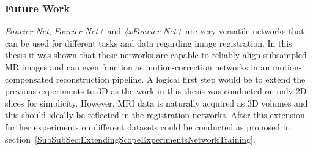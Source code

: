 \subsubsection{Future Work} \label{SubSubSec:FutureWork}
\emph{Fourier-Net}, \emph{Fourier-Net+} and \emph{4xFourier-Net+} are very versatile networks that can be used for different tasks and data regarding image registration. In this thesis it was shown that these networks are capable to reliably align subsampled MR images and can even function as motion-correction networks in an motion-compensated reconstruction pipeline. A logical first step would be to extend the previous experiments to 3D as the work in this thesis was conducted on only 2D slices for simplicity. However, MRI data is naturally acquired as 3D volumes and this should ideally be reflected in the registration networks. After this extension further experiments on different datasets could be conducted as proposed in section~\ref{SubSubSec:ExtendingScopeExperimentsNetworkTraining}.